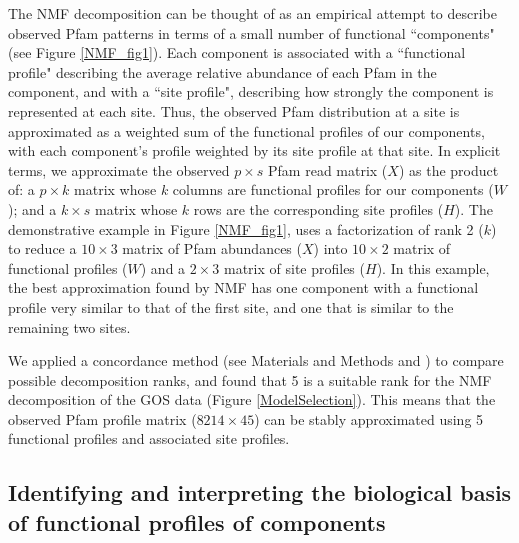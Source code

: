 The NMF decomposition can be thought of as an empirical attempt to describe observed Pfam patterns in terms of a small number of functional ``components" (see Figure \ref{NMF_fig1}).  Each component is associated with a ``functional profile" describing the average relative abundance of each Pfam in the component, and with a ``site profile", describing how strongly the component is represented at each site.  Thus, the observed Pfam distribution at a site is approximated as a weighted sum of the functional profiles of our components, with each component's profile weighted by its site profile at that site. In explicit terms, we approximate the observed $p\times s$ Pfam read matrix ($X$) as the product of: a $p\times k$ matrix whose $k$ columns are functional profiles for our components ($W$); and a $k\times s$ matrix whose $k$ rows are the corresponding site profiles ($H$). The demonstrative example in Figure \ref{NMF_fig1}, uses a factorization of rank 2 ($k$) to reduce a $10\times 3$ matrix of Pfam abundances ($X$) into $10\times 2$ matrix of functional profiles ($W$) and a $2\times 3$ matrix of site profiles ($H$). In this example, the best approximation found by NMF has one component with a functional profile very similar to that of the first site, and one that is similar to the remaining two sites.

We applied a concordance method (see Materials and Methods and \cite{jiang_non-negative_2012}) to compare possible decomposition ranks, and found that 5 is a suitable rank for the NMF decomposition of the GOS data (Figure \ref{ModelSelection}). This means that the observed Pfam profile matrix ($8214 \times 45$) can be stably approximated using 5 functional profiles and associated site profiles. 

\subsection{Identifying and interpreting the biological basis of functional profiles of components}

